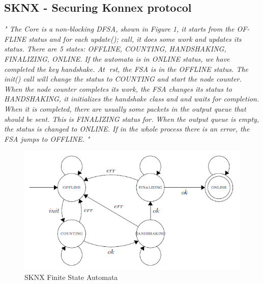 \subsection{SKNX - Securing Konnex protocol}
\emph{" The Core is a non-blocking DFSA, shown in Figure 1, it starts from the OF-
	FLINE status and for each update(); call, it does some work and updates its
	status. There are 5 states: OFFLINE, COUNTING, HANDSHAKING, FINALIZING,
	ONLINE. If the automata is in ONLINE status, we have completed the key
	handshake.
	At rst, the FSA is in the OFFLINE status. The init() call will change
	the status to COUNTING and start the node counter. When the node counter
	completes its work, the FSA changes its status to HANDSHAKING, it initializes
	the handshake class and and waits for completion. When it is completed,
	there are usually some packets in the output queue that should be sent. This
	is FINALIZING status for. When the output queue is empty, the status is
	changed to ONLINE. If in the whole process there is an error, the FSA jumps
	to OFFLINE. "}
\begin{figure}[h]
	\vspace{1cm}
	\centering
	\includegraphics[scale=0.8]{Images/Diagrams/SKNX_states}
	\caption{SKNX Finite State Automata}
\end{figure}